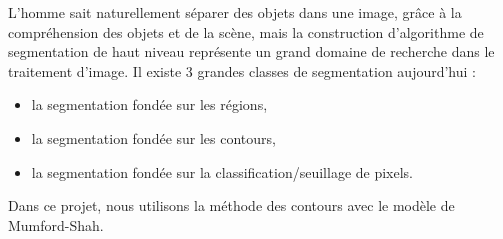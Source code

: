 \bigskip

L'homme sait naturellement séparer des objets dans une image, grâce à la compréhension des objets et de la scène,
mais la construction d'algorithme de segmentation de haut niveau représente un grand domaine de recherche dans le traitement d'image. 
Il existe 3 grandes classes de segmentation aujourd'hui :
\begin{itemize}
\item la segmentation fondée sur les régions,
\item la segmentation fondée sur les contours,
\item la segmentation fondée sur la classification/seuillage de pixels.
\end{itemize}


Dans ce projet, nous utilisons la méthode des contours avec le modèle de Mumford-Shah.

